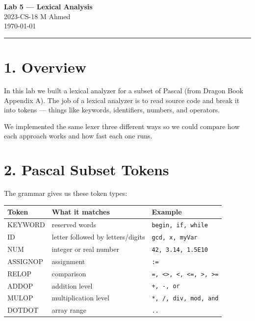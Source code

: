 \documentclass[12pt, a4paper]{article}
\begin{document}
\begin{center}
    {\Large \textbf{Lab 5 — Lexical Analysis}}\\[0.5em]
    {\large 2023-CS-18 M Ahmed}\\[0.3em]
    \today
\end{center}

\bigskip
\hrule
\bigskip

\section*{1. Overview}

In this lab we built a lexical analyzer for a subset of Pascal
(from Dragon Book Appendix A). The job of a lexical analyzer is to
read source code and break it into tokens — things like keywords,
identifiers, numbers, and operators.

We implemented the same lexer three different ways so we could
compare how each approach works and how fast each one runs.

\section*{2. Pascal Subset Tokens}

The grammar gives us these token types:

\begin{center}
\begin{tabular}{lll}
\toprule
Token & What it matches & Example \\
\midrule
KEYWORD   & reserved words                  & \texttt{begin, if, while} \\
ID        & letter followed by letters/digits & \texttt{gcd, x, myVar} \\
NUM       & integer or real number           & \texttt{42, 3.14, 1.5E10} \\
ASSIGNOP  & assignment                       & \texttt{:=} \\
RELOP     & comparison                       & \texttt{=, <>, <, <=, >, >=} \\
ADDOP     & addition level                   & \texttt{+, -, or} \\
MULOP     & multiplication level             & \texttt{*, /, div, mod, and} \\
DOTDOT    & array range                      & \texttt{..} \\
\bottomrule
\end{tabular}
\end{center}
\end{document}
